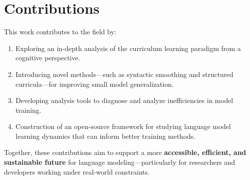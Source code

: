 \section*{Contributions}

This work contributes to the field by:

\begin{enumerate}
    \item Exploring an in-depth analysis of the curriculum learning paradigm from a cognitive perspective.

    \item Introducing novel methods—such as syntactic smoothing and structured curricula—for improving small model generalization.

    \item Developing analysis tools to diagnose and analyze inefficiencies in model training.

    \item Construction of an open-source framework for studying language model learning dynamics that can inform better training methods.
\end{enumerate}

Together, these contributions aim to support a more \textbf{accessible, efficient, and sustainable future} for language modeling—particularly for researchers and developers working under real-world constraints.
